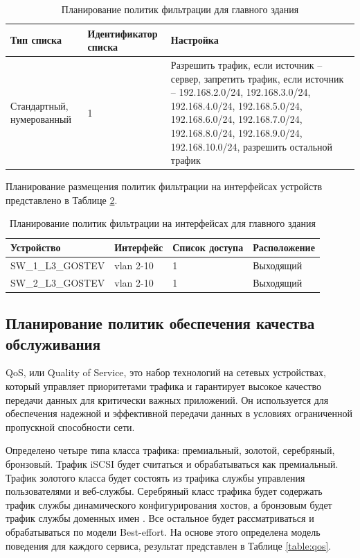 \documentclass[14pt, a4paper]{extarticle}
\numberwithin{equation}{section}
\begin{document}
\begin{table}[H]
\centering
\small
\caption{Планирование политик фильтрации для главного здания}
\label{table:acl_plan}
\begin{tabular}{|p{4cm}|p{3cm}|p{8cm}|}
\hline
\textbf{Тип списка} & \textbf{Идентификатор списка} & \textbf{Настройка}\\ \hline
Стандартный, нумерованный & 1 & Разрешить трафик, если источник -- сервер,
запретить трафик, если источник -- 192.168.2.0/24, 192.168.3.0/24, 192.168.4.0/24,
192.168.5.0/24, 192.168.6.0/24, 192.168.7.0/24, 192.168.8.0/24, 192.168.9.0/24, 192.168.10.0/24,
разрешить остальной трафик
\\ \hline
\end{tabular}
\end{table}

Планирование размещения политик фильтрации на интерфейсах устройств представлено в Таблице \ref{table:acl_ints}.
\begin{table}[H]
\centering
\small
\caption{Планирование политик фильтрации на интерфейсах для главного здания}
\label{table:acl_ints}
\begin{tabular}{|p{4cm}|p{3cm}|p{2cm}|p{6cm}|}
\hline
\textbf{Устройство} & \textbf{Интерфейс} & \textbf{Список доступа} & \textbf{Расположение} \\ \hline
SW\_1\_L3\_GOSTEV & vlan 2-10 & 1 & Выходящий \\ \hline
SW\_2\_L3\_GOSTEV & vlan 2-10 & 1 & Выходящий \\ \hline
\end{tabular}
\end{table}



\subsection{Планирование политик обеспечения качества обслуживания}

QoS, или Quality of Service, это набор технологий на сетевых устройствах, который 
управляет приоритетами трафика и гарантирует высокое качество передачи данных для 
критически важных приложений. Он используется для обеспечения надежной и эффективной 
передачи данных в условиях ограниченной пропускной способности сети.

Определено четыре типа класса трафика: премиальный, золотой, серебряный, бронзовый. 
Трафик iSCSI будет считаться и обрабатываться как премиальный. Трафик золотого класса будет состоять 
из трафика службы управления пользователями и веб-службы. 
Серебряный класс трафика будет содержать трафик службы динамического конфигурирования хостов, а 
бронзовым будет трафик службы доменных имен \cite{qos}. Все остальное будет рассматриваться и обрабатываться по модели Best-effort.
На основе этого определена модель поведения для каждого сервиса, результат представлен в Таблице \ref{table:qos}.
\end{document}
